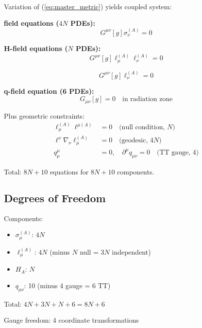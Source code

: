\documentclass[11pt,a4paper]{article}
\theoremstyle{definition}
\theoremstyle{remark}
\begin{document}
	Variation of (\ref{eq:master_metric}) yields coupled system:
	
	\textbf{field equations ($4N$ PDEs):}
	\begin{equation}\label{eq:sigma_master_eq}
		\boxed{G^{\mu\nu}[g]\sigma_\nu^{(A)} = 0}
	\end{equation}
	
	\textbf{H-field equations ($N$ PDEs):}
	\begin{equation}\label{eq:H_master_eq}
		\boxed{G^{\mu\nu}[g]\ell_\mu^{(A)}\ell_\nu^{(A)} = 0}
	\end{equation}
	
	\begin{equation}\label{eq:ell_master_eq}
		\boxed{G^{\mu\nu}[g]\ell_\nu^{(A)} = 0}
	\end{equation}
	
	\textbf{q-field equation (6 PDEs):}
	\begin{equation}\label{eq:q_master_eq}
		\boxed{G_{\mu\nu}[g] = 0 \quad \text{in radiation zone}}
	\end{equation}
	
	Plus geometric constraints:
	\begin{align}
		\ell_\mu^{(A)}\ell^{\mu(A)} &= 0 \quad \text{(null condition, $N$)}\\
		\ell^\nu\nabla_\nu\ell_\mu^{(A)} &= 0 \quad \text{(geodesic, $4N$)}\\
		q^\mu_\mu &= 0, \quad \partial^\mu q_{\mu\nu} = 0 \quad \text{(TT gauge, 4)}
	\end{align}
	
	Total: $8N + 10$ equations for $8N + 10$ components.
	
	\subsection{Degrees of Freedom}
	
	Components:
	\begin{itemize}
		\item $\sigma_\mu^{(A)}$: $4N$
		\item $\ell_\mu^{(A)}$: $4N$ (minus $N$ null = $3N$ independent)
		\item $H_A$: $N$
		\item $q_{\mu\nu}$: 10 (minus 4 gauge = 6 TT)
	\end{itemize}
	
	Total: $4N + 3N + N + 6 = 8N + 6$
	
	Gauge freedom: 4 coordinate transformations
	
\end{document}
